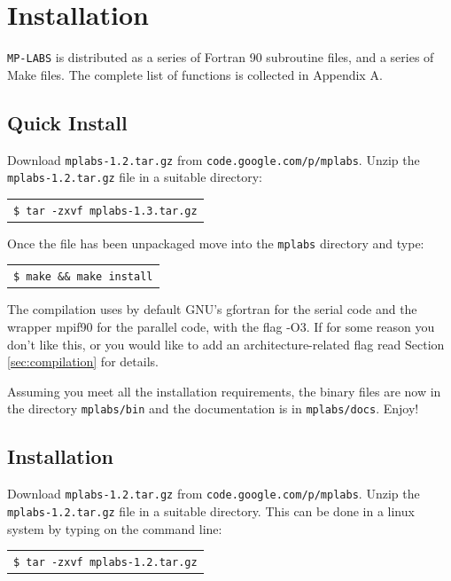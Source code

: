 \documentclass[12pt]{report}
\begin{document}
\tableofcontents
\pagebreak
\section*{}
\pagebreak


\chapter{Installation}
\verb+MP-LABS+ is distributed as a series of Fortran 90 subroutine files, and a series of Make files. The complete list of functions is collected in Appendix A.

\section{Quick Install}
Download \verb+mplabs-1.2.tar.gz+ from \verb+code.google.com/p/mplabs+. Unzip the \verb+mplabs-1.2.tar.gz+ file in a suitable directory:

\begin{tabular}{l}
\texttt{\$ tar -zxvf mplabs-1.3.tar.gz}
\end{tabular}

Once the file has been unpackaged move into the \verb+mplabs+ directory and type:

\begin{tabular}{l}
\texttt{\$ make \&\& make install}
\end{tabular}

The compilation uses by default GNU's gfortran for the serial code and the wrapper mpif90 for the parallel code, with the flag -O3. If for some reason you don't like this, or you would like to add an architecture-related flag read Section \ref{sec:compilation} for details. 

Assuming you meet all the installation requirements, the binary files are now in the directory \verb+mplabs/bin+ and the documentation is in \verb+mplabs/docs+. Enjoy!


\section{Installation}
Download \verb+mplabs-1.2.tar.gz+ from \verb+code.google.com/p/mplabs+. Unzip the \verb+mplabs-1.2.tar.gz+ file in a suitable directory. This can be done in a linux system by typing on the command line:

\begin{tabular}{l}
\texttt{\$ tar -zxvf mplabs-1.2.tar.gz}
\end{tabular}
\end{document}
